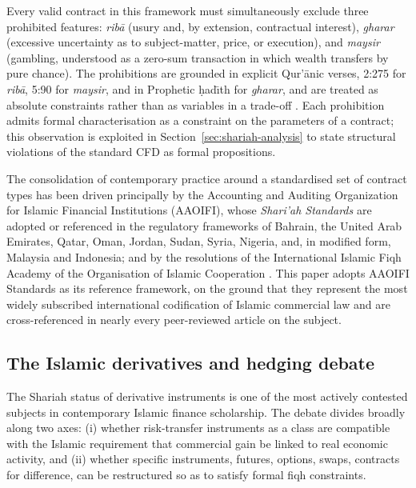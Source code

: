 \documentclass[preprint,12pt,authoryear]{elsarticle}
\theoremstyle{definition}
\begin{document}
Every valid contract in this framework must simultaneously exclude
three prohibited features: \emph{rib\={a}} (usury and, by extension,
contractual interest), \emph{gharar} (excessive uncertainty as to
subject-matter, price, or execution), and \emph{maysir} (gambling,
understood as a zero-sum transaction in which wealth transfers by pure
chance). The prohibitions are grounded in explicit Qur'\={a}nic
verses, 2:275 for \emph{rib\={a}}, 5:90 for \emph{maysir}, and in
Prophetic \d{h}ad\={\i}th for \emph{gharar}, and are treated as absolute
constraints rather than as variables in a trade-off
\citep{Chapra1985,Warde2010}. Each prohibition admits formal
characterisation as a constraint on the parameters of a contract; this
observation is exploited in Section~\ref{sec:shariah-analysis} to state
structural violations of the standard CFD as formal propositions.

The consolidation of contemporary practice around a standardised set of
contract types has been driven principally by the Accounting and
Auditing Organization for Islamic Financial Institutions (AAOIFI),
whose \emph{Shari'ah Standards} \citep{AAOIFI2015} are adopted or
referenced in the regulatory frameworks of Bahrain, the United Arab
Emirates, Qatar, Oman, Jordan, Sudan, Syria, Nigeria, and, in modified
form, Malaysia and Indonesia; and by the resolutions of the
International Islamic Fiqh Academy of the Organisation of Islamic
Cooperation \citep{OICFiqh63,OICFiqh179}. This paper adopts AAOIFI
Standards as its reference framework, on the ground that they
represent the most widely subscribed international codification of
Islamic commercial law and are cross-referenced in nearly every
peer-reviewed article on the subject.

\subsection{The Islamic derivatives and hedging debate}
\label{sec:lit-derivatives}

The Shariah status of derivative instruments is one of the most
actively contested subjects in contemporary Islamic finance
scholarship. The debate divides broadly along two axes: (i) whether
risk-transfer instruments as a class are compatible with the Islamic
requirement that commercial gain be linked to real economic activity,
and (ii) whether specific instruments, futures, options, swaps,
contracts for difference, can be restructured so as to satisfy formal
fiqh constraints.
\end{document}
